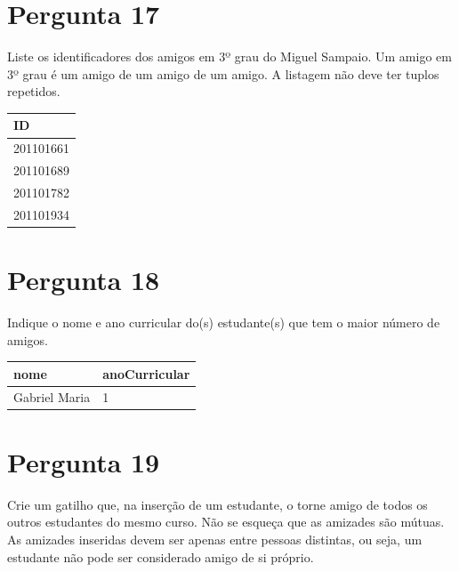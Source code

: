 {\section{Pergunta 17}
Liste os identificadores dos amigos em 3º grau do Miguel Sampaio. Um amigo em 3º grau é um amigo de um amigo de um amigo. A listagem não deve ter tuplos repetidos.
\begin{center} \begin{tabular}{l}
    \textbf{ID} \\ \hline
    201101661   \\
    201101689   \\
    201101782   \\
    201101934 
\end{tabular} \end{center}


\section{Pergunta 18}
Indique o nome e ano curricular do(s) estudante(s) que tem o maior número de amigos.
\begin{center} \begin{tabular}{l | l}
    \textbf{nome} & \textbf{anoCurricular} \\ \hline
    Gabriel Maria & 1
\end{tabular} \end{center}


\section{Pergunta 19}
Crie um gatilho que, na inserção de um estudante, o torne amigo de todos os outros estudantes do mesmo curso. Não se esqueça que as amizades são mútuas. As amizades inseridas devem ser apenas entre pessoas distintas, ou seja, um estudante não pode ser considerado amigo de si próprio.


}
